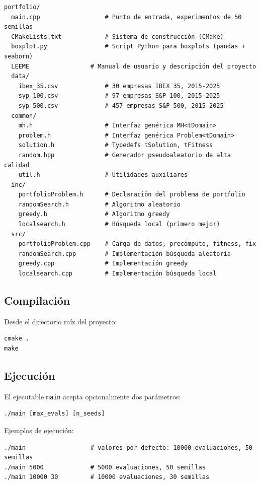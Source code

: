 \documentclass[12pt,a4paper]{article}
\begin{document}
\begin{verbatim}
portfolio/
  main.cpp                  # Punto de entrada, experimentos de 50 semillas
  CMakeLists.txt            # Sistema de construcción (CMake)
  boxplot.py                # Script Python para boxplots (pandas + seaborn)
  LEEME                 # Manual de usuario y descripción del proyecto
  data/
    ibex_35.csv             # 30 empresas IBEX 35, 2015-2025
    syp_100.csv             # 97 empresas S&P 100, 2015-2025
    syp_500.csv             # 457 empresas S&P 500, 2015-2025
  common/
    mh.h                    # Interfaz genérica MH<tDomain>
    problem.h               # Interfaz genérica Problem<tDomain>
    solution.h              # Typedefs tSolution, tFitness
    random.hpp              # Generador pseudoaleatorio de alta calidad
    util.h                  # Utilidades auxiliares
  inc/
    portfolioProblem.h      # Declaración del problema de portfolio
    randomSearch.h          # Algoritmo aleatorio
    greedy.h                # Algoritmo greedy
    localsearch.h           # Búsqueda local (primero mejor)
  src/
    portfolioProblem.cpp    # Carga de datos, precómputo, fitness, fix
    randomSearch.cpp        # Implementación búsqueda aleatoria
    greedy.cpp              # Implementación greedy
    localsearch.cpp         # Implementación búsqueda local
\end{verbatim}

\subsection{Compilación}

Desde el directorio raíz del proyecto:

\begin{verbatim}
cmake .
make
\end{verbatim}

\subsection{Ejecución}

El ejecutable \texttt{main} acepta opcionalmente dos parámetros:

\begin{verbatim}
./main [max_evals] [n_seeds]
\end{verbatim}

\noindent Ejemplos de ejecución:
\begin{verbatim}
./main                  # valores por defecto: 10000 evaluaciones, 50 semillas
./main 5000             # 5000 evaluaciones, 50 semillas
./main 10000 30         # 10000 evaluaciones, 30 semillas
\end{verbatim}
\end{document}
